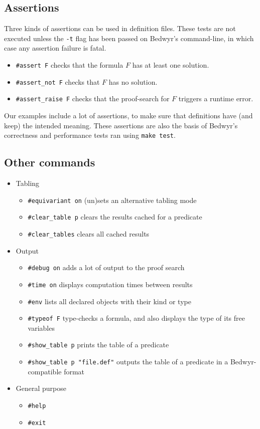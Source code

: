 \documentclass{article}
\begin{document}
\subsection{Assertions}

Three kinds of assertions can be used in definition files.
These tests are not executed unless the \verb.-t. flag has been passed
on Bedwyr's command-line, in which case any assertion failure is fatal.
\begin{itemize}
\item
\verb.#assert F. checks that the formula $F$ has at least one solution.
\item
\verb.#assert_not F. checks that $F$ has no solution.
\item
\verb.#assert_raise F. checks that the proof-search for $F$ triggers
a runtime error.
\end{itemize}

Our examples include a lot of assertions, to make sure that definitions have
(and keep) the intended meaning. These assertions are also the basis of
Bedwyr's correctness and performance tests ran using \verb.make test..

\subsection{Other commands}
\begin{itemize}
  \item Tabling
    \begin{itemize}
      \item \verb.#equivariant on. (un)sets an alternative tabling mode
      \item \verb.#clear_table p. clears the results cached for a
        predicate
      \item \verb.#clear_tables. clears all cached results
    \end{itemize}

  \item Output
    \begin{itemize}
      \item \verb.#debug on. adds a lot of output to the proof search
      \item \verb.#time on. displays computation times between results
      \item \verb.#env. lists all declared objects with their kind or
        type
      \item \verb.#typeof F. type-checks a formula, and also displays
        the type of its free variables
      \item \verb.#show_table p. prints the table of a predicate
      \item \verb+#show_table p "file.def"+ outputs the table of a
        predicate in a Bedwyr-compatible format
    \end{itemize}

  \item General purpose
    \begin{itemize}
      \item \verb.#help.
      \item \verb.#exit.
    \end{itemize}
\end{itemize}
\end{document}
